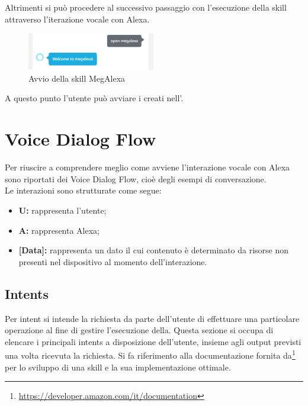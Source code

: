 \begin{itemize}
Altrimenti si può procedere al successivo passaggio con l'esecuzione della skill  attraverso l'iterazione vocale con Alexa. \\

\begin{figure}[!ht]
	\centering
	\includegraphics[width=0.5\textwidth]{images/OpenMegAlexa.png}
	\caption{Avvio della skill MegAlexa}
\end{figure}

\end{itemize}

A questo punto l'utente può avviare i  creati nell'.\\

\newpage
\section{Voice Dialog Flow}
\label{VDF}
Per riuscire a comprendere meglio come avviene l'interazione vocale con Alexa sono riportati dei Voice Dialog Flow, cioè degli esempi di conversazione.\\

Le interazioni sono strutturate come segue:
\begin{itemize}
	\item \textbf{U:} rappresenta l'utente;
	\item \textbf{A:} rappresenta Alexa;
	\item \textbf{[Data]:} rappresenta un dato il cui contenuto è determinato da risorse non presenti nel dispositivo al momento dell'interazione.
\end{itemize}

\subsection{Intents}
Per intent si intende la richiesta da parte dell'utente di effettuare una particolare operazione al fine di gestire l'esecuzione della. 
Questa sezione si occupa di elencare i principali intents a disposizione dell'utente, insieme agli output previsti una volta ricevuta la richiesta.
Si fa riferimento alla documentazione fornita da\footnote{\url{https://developer.amazon.com/it/documentation}} per lo sviluppo di una skill e la sua implementazione ottimale.

